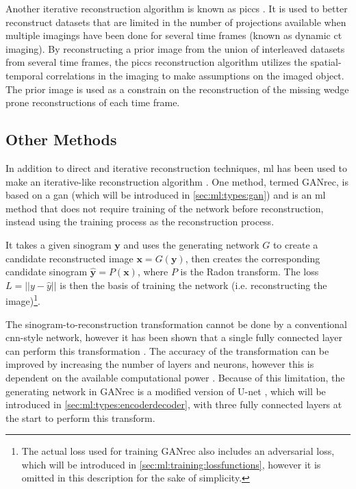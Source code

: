Another iterative reconstruction algorithm is known as \gls{piccs} \cite{piccs}. It is used to better reconstruct datasets that are limited in the number of projections available when multiple imagings have been done for several time frames (known as dynamic \gls{ct} imaging). By reconstructing a prior image from the union of interleaved datasets from several time frames, the \gls{piccs} reconstruction algorithm utilizes the spatial-temporal correlations in the imaging to make assumptions on the imaged object. The prior image is used as a constrain on the reconstruction of the missing wedge prone reconstructions of each time frame. 


\subsection{Other Methods}
In addition to direct and iterative reconstruction techniques, \gls{ml} has been used to make an iterative-like reconstruction algorithm \cite{GANrec}. One method, termed GANrec, is based on a \gls{gan} (which will be introduced in \cref{sec:ml:types:gan}) and is an \gls{ml} method that does not require training of the network before reconstruction, instead using the training process as the reconstruction process. 

It takes a given sinogram $\bm{y}$ and uses the generating network $G$ to create a candidate reconstructed image $\bm{x} = G(\bm{y})$, then creates the corresponding candidate sinogram $\hat{\bm{y}} = P(\bm{x})$, where $P$ is the Radon transform. The loss $L = \left|\left| y - \hat{y} \right|\right|$ is then the basis of training the network (i.e. reconstructing the image)\footnote{The actual loss used for training GANrec also includes an adversarial loss, which will be introduced in \cref{sec:ml:training:lossfunctions}, however it is omitted in this description for the sake of simplicity. }.

The sinogram-to-reconstruction transformation cannot be done by a conventional \gls{cnn}-style network, however it has been shown that a single fully connected layer can perform this transformation \cite{PASCHALIS2004211}. The accuracy of the transformation can be improved by increasing the number of layers and neurons, however this is dependent on the available computational power \cite{GANrec}. Because of this limitation, the generating network in GANrec is a modified version of U-net \cite{unet}, which will be introduced in \cref{sec:ml:types:encoderdecoder}, with three fully connected layers at the start to perform this transform. 